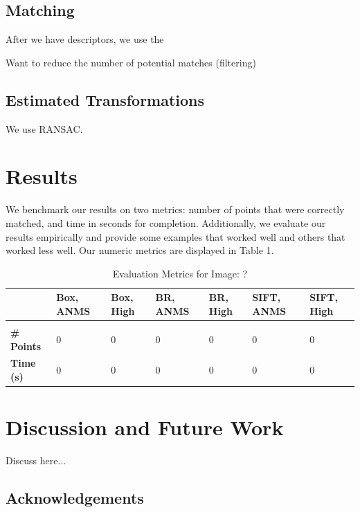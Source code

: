 \documentclass[12pt]{article}
\begin{document}
\subsection*{Matching}
After we have descriptors, we use the 

Want to reduce the number of potential matches (filtering)

\subsection*{Estimated Transformations}
We use RANSAC.

\section*{Results}

We benchmark our results on two metrics: number of points that were correctly matched, and time in seconds for completion. Additionally, we evaluate our results empirically and provide some examples that worked well and others that worked less well. Our numeric metrics are displayed in Table 1. 

\begin{table}[t]
\caption{Evaluation Metrics for Image: ?}
\label{image}
\begin{center}
\begin{tabular}{l|llllll}
\multicolumn{1}{l}{} & \multicolumn{1}{l}{\bf Box, ANMS} & \multicolumn{1}{l}{\bf Box, High} & \multicolumn{1}{l}{\bf BR, ANMS} & \multicolumn{1}{l}{\bf BR, High} & \multicolumn{1}{l}{\bf SIFT, ANMS} & \multicolumn{1}{l}{\bf SIFT, High}
\\ \hline \\
{\bf \# Points} & 0 & 0 & 0 & 0 & 0 & 0 \\
{\bf Time (s)} & 0 & 0 & 0 & 0 & 0 & 0 \\
\end{tabular}
\end{center}
\end{table}

\section*{Discussion and Future Work}

Discuss here...

\subsection*{Acknowledgements}
\end{document}
